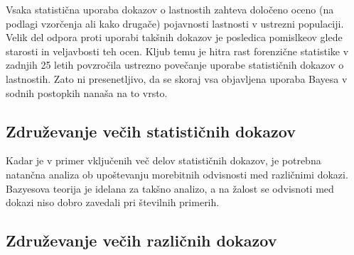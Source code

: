 \documentclass[a4paper,12pt]{article}
\begin{document}
Vsaka statistična uporaba dokazov o lastnostih zahteva določeno oceno (na podlagi vzorčenja ali kako drugače) pojavnosti lastnosti v 
ustrezni populaciji. Velik del odpora proti uporabi takšnih dokazov je posledica pomislkeov glede starosti in veljavbosti teh ocen. Kljub 
temu je hitra rast forenzične statistike v zadnjih 25 letih povzročila ustrezno povečanje uporabe statističnih dokazov o lastnostih. Zato 
ni presenetljivo, da se skoraj vsa objavljena uporaba Bayesa v sodnih postopkih nanaša na to vrsto.

\subsection{Združevanje večih statističnih dokazov}
Kadar je v primer vključenih več delov statističnih dokazov, je potrebna natančna analiza ob upoštevanju morebitnih odvisnosti med 
različnimi dokazi. Bazyesova teorija je idelana za takšno analizo, a na žalost se odvisnoti med dokazi niso dobro zavedali pri 
številnih primerih. 

\subsection{Združevanje večih različnih dokazov}
\end{document}
